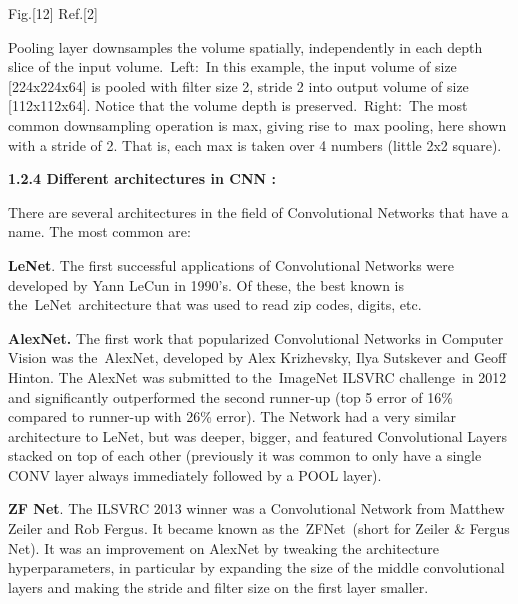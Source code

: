 \documentclass{article} %
\begin{document}
\noindent Fig.[12]  Ref.[2]

\noindent Pooling layer downsamples the volume spatially, independently in each depth slice of the input volume.~Left:~In this example, the input volume of size [224x224x64] is pooled with filter size 2, stride 2 into output volume of size [112x112x64]. Notice that the volume depth is preserved.~Right:~The most common downsampling operation is max, giving rise to~max pooling, here shown with a stride of 2. That is, each max is taken over 4 numbers (little 2x2 square).

\noindent 

\noindent 

\noindent 

\noindent 

\noindent 

\noindent 

\noindent 

\noindent 

\noindent 

\noindent 

\noindent 

\noindent 

\noindent 

\noindent \textbf{1.2.4 Different architectures in CNN :}

\noindent There are several architectures in the field of Convolutional Networks that have a name. The most common are:

\noindent \textbf{LeNet}. The first successful applications of Convolutional Networks were developed by Yann LeCun in 1990's. Of these, the best known is the~LeNet~architecture that was used to read zip codes, digits, etc.

\noindent \textbf{AlexNet.} The first work that popularized Convolutional Networks in Computer Vision was the~AlexNet, developed by Alex Krizhevsky, Ilya Sutskever and Geoff Hinton. The AlexNet was submitted to the~ImageNet ILSVRC challenge~in 2012 and significantly outperformed the second runner-up (top 5 error of 16\% compared to runner-up with 26\% error). The Network had a very similar architecture to LeNet, but was deeper, bigger, and featured Convolutional Layers stacked on top of each other (previously it was common to only have a single CONV layer always immediately followed by a POOL layer).

\noindent \textbf{ZF Net}. The ILSVRC 2013 winner was a Convolutional Network from Matthew Zeiler and Rob Fergus. It became known as the~ZFNet~(short for Zeiler \& Fergus Net). It was an improvement on AlexNet by tweaking the architecture hyperparameters, in particular by expanding the size of the middle convolutional layers and making the stride and filter size on the first layer smaller.
\end{document}
